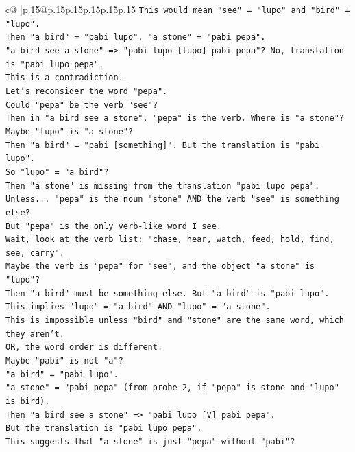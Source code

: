 \documentclass{article}
\begin{document}
{\begin{supertabular}{c@{$\;$}|p{.15\linewidth}@{}p{.15\linewidth}p{.15\linewidth}p{.15\linewidth}p{.15\linewidth}p{.15\linewidth}}
{{{\texttt{This would mean "see" = "lupo" and "bird" = "lupo".} \\
\texttt{Then "a bird" = "pabi lupo". "a stone" = "pabi pepa".} \\
\texttt{"a bird see a stone" => "pabi lupo {[}lupo{]} pabi pepa"? No, translation is "pabi lupo pepa".} \\
\texttt{This is a contradiction.} \\
\texttt{Let's reconsider the word "pepa".} \\
\texttt{Could "pepa" be the verb "see"?} \\
\texttt{Then in "a bird see a stone", "pepa" is the verb. Where is "a stone"?} \\
\texttt{Maybe "lupo" is "a stone"?} \\
\texttt{Then "a bird" = "pabi {[}something{]}". But the translation is "pabi lupo".} \\
\texttt{So "lupo" = "a bird"?} \\
\texttt{Then "a stone" is missing from the translation "pabi lupo pepa".} \\
\texttt{Unless... "pepa" is the noun "stone" AND the verb "see" is something else?} \\
\texttt{But "pepa" is the only verb{-}like word I see.} \\
\texttt{Wait, look at the verb list: "chase, hear, watch, feed, hold, find, see, carry".} \\
\texttt{Maybe the verb is "pepa" for "see", and the object "a stone" is "lupo"?} \\
\texttt{Then "a bird" must be something else. But "a bird" is "pabi lupo".} \\
\texttt{This implies "lupo" = "a bird" AND "lupo" = "a stone".} \\
\texttt{This is impossible unless "bird" and "stone" are the same word, which they aren't.} \\
\texttt{OR, the word order is different.} \\
\texttt{Maybe "pabi" is not "a"?} \\
\texttt{"a bird" = "pabi lupo".} \\
\texttt{"a stone" = "pabi pepa" (from probe 2, if "pepa" is stone and "lupo" is bird).} \\
\texttt{Then "a bird see a stone" => "pabi lupo {[}V{]} pabi pepa".} \\
\texttt{But the translation is "pabi lupo pepa".} \\
\texttt{This suggests that "a stone" is just "pepa" without "pabi"?} \\
}}}
\end{supertabular}}
\end{document}
